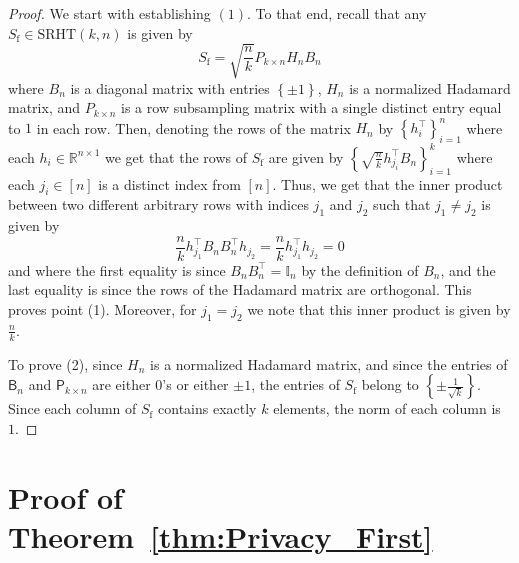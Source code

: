 \documentclass[11pt]{article}
\theoremstyle{definition}
\newtheorem{defn}{Definition}
\theoremstyle{plain}
\providecommand{\theoremref}[1]{Theorem~\ref{#1}}
\providecommand{\lemmaref}[1]{Lemma~\ref{#1}}
\newcommand{\reals}{\mathbb{R}}
\providecommand{\brI}{\mathbb{I}}
\begin{document}
\begin{proof}
    We start with establishing $(1)$. To that end, recall that any $S_{\mathrm{f}} \in \mathrm{SRHT}(k, n)$ is given by 
    \begin{equation}
        S_{\mathrm{f}} = \sqrt{\frac{n}{k}} P_{k\times n} H_n B_n
    \end{equation}
    where $B_n$ is a diagonal matrix with entries $\left\{\pm1\right\}$, $H_n$ is a normalized Hadamard matrix, and $P_{k\times n}$ is a row subsampling matrix with a single distinct entry equal to $1$ in each row. Then, denoting the rows of the matrix $H_n$ by $\left\{h^{\top}_i\right\}^{n}_{i=1}$ where each $h_i \in \reals^{n\times 1}$ we get that the rows of $S_{\mathrm{f}}$ are given by $\left\{\sqrt{\frac{n}{k}}h^{\top}_{j_i} B_n\right\}^{k}_{i=1}$ where each $j_i \in [n]$ is a distinct index from $[n]$. Thus, we get that the inner product between two different arbitrary rows with indices $j_1$ and $j_2$ such that $j_1\ne j_2$ is given by 
    \begin{equation}
        \frac{n}{k} h^{\top}_{j_1} B_n B^{\top}_n h_{j_2} = \frac{n}{k} h^{\top}_{j_1} h_{j_2} = 0
    \end{equation}
    and where the first equality is since $B_n B^{\top}_n = \brI_n$ by the definition of $B_n$, and the last equality is since the rows of the Hadamard matrix are orthogonal. This proves point (1). Moreover, for $j_1 = j_2$ we note that this inner product is given by $\frac{n}{k}$. 

    To prove (2), since $H_n$ is a normalized Hadamard matrix, and since the entries of $\mathsf{B}_n$ and $\mathsf{P}_{k\times n}$ are either $0$'s or either $\pm 1$, the entries of $S_{\mathrm{f}}$ belong to $\left\{\pm \frac{1}{\sqrt{k}}\right\}$. Since each column of $S_{\mathrm{f}}$ contains exactly $k$ elements, the norm of each column is $1$.  
\end{proof}
\section{Proof of \theoremref{thm:Privacy_First}}
\label{app:full_proof_privacy}

\end{document}

